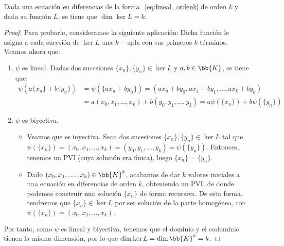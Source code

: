 \begin{prop}
    Dada una ecuación en diferencias de la forma ~\ref{eq:lineal_ordenk} de orden $k$ y dada su función $L$, se tiene que $\dim \ker L = k$.
\end{prop}
\begin{proof}
    Para probarlo, consideramos la siguiente aplicación:
    Dicha función le asigna a cada sucesión de $\ker L$ una $k-$upla con sus primeros $k$ términos. Veamos ahora que:
    \begin{enumerate}
        \item $\psi$ es lineal.
        Dadas dos sucesiones $\{x_n\}, \{y_n\}\in \ker L$ y $a,b\in\bb{K}$, se tiene que:
        \begin{align*}
            \psi(a\{x_n\} + b\{y_n\}) &= \psi(\{ax_n + by_n\}) = (ax_0 + by_0, ax_1 + by_1, \ldots, ax_k + by_k)\\ 
            &= a(x_0, x_1, \ldots, x_k) + b(y_0, y_1, \ldots, y_k) = a\psi(\{x_n\}) + b\psi(\{y_n\})
        \end{align*}
        \item $\psi$ es biyectiva.
        
        \begin{itemize}
            \item Veamos que es inyectiva. Sean dos sucesiones $\{x_n\}, \{y_n\}\in \ker L$ tal que $\psi(\{x_n\}) = (x_0, x_1, \ldots, x_k) = (y_0, y_1, \ldots, y_k) = \psi(\{y_n\})$. Entonces, tenemos un PVI (cuya solución era única), luego $\{x_n\} = \{y_n\}$.

            \item Dado $(x_0, x_1, \ldots, x_k)\in \bb{K}^k$, acabamos de dar $k$ valores iniciales a una ecuación en diferencias de orden $k$, obteniendo un PVI, de donde podemos construir una solución $\{x_n\}$ de forma recursiva. De esta forma, tendremos que $\{x_n\}\in \ker L$ por ser solución de la parte homogénea, con ${\psi(\{x_n\})=(x_0, x_1, \ldots, x_k)}$.
        \end{itemize}
    \end{enumerate}

    Por tanto, como $\psi$ es lineal y biyectiva, tenemos que el dominio y el codominio tienen la misma dimensión, por lo que $\dim \ker L=\dim \bb{K}^k = k$.
\end{proof}

